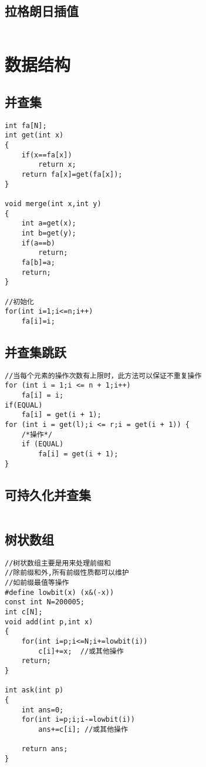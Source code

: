 \documentclass[twocolumn,a4]{article}
\begin{document}
\subsection{拉格朗日插值}
\begin{lstlisting}

\end{lstlisting}
\section{数据结构}

\subsection{并查集}
\begin{lstlisting}
int fa[N];
int get(int x)
{
    if(x==fa[x])
        return x;
    return fa[x]=get(fa[x]);
}

void merge(int x,int y)
{
    int a=get(x);
    int b=get(y);
    if(a==b)
        return;
    fa[b]=a;
    return;
}

//初始化
for(int i=1;i<=n;i++)
    fa[i]=i;
\end{lstlisting}

\subsection{并查集跳跃}
\begin{lstlisting}
//当每个元素的操作次数有上限时，此方法可以保证不重复操作
for (int i = 1;i <= n + 1;i++)
    fa[i] = i;
if(EQUAL)
    fa[i] = get(i + 1);
for (int i = get(l);i <= r;i = get(i + 1)) {
    /*操作*/
    if (EQUAL)
        fa[i] = get(i + 1);
}
\end{lstlisting}

\subsection{可持久化并查集}
\begin{lstlisting}

\end{lstlisting}

\subsection{树状数组}
\begin{lstlisting}
//树状数组主要是用来处理前缀和
//除前缀和外,所有前缀性质都可以维护
//如前缀最值等操作
#define lowbit(x) (x&(-x))
const int N=200005;
int c[N];
void add(int p,int x)
{
    for(int i=p;i<=N;i+=lowbit(i))
        c[i]+=x;  //或其他操作
    return;
}

int ask(int p)
{
    int ans=0;
    for(int i=p;i;i-=lowbit(i))
        ans+=c[i]; //或其他操作

    return ans;
}
\end{lstlisting}
\end{document}
